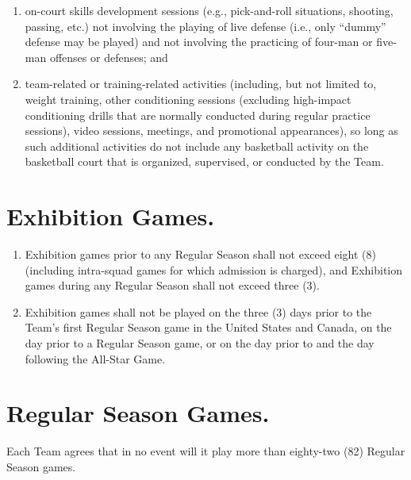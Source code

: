 \documentclass[
]{book}
\providecommand{\tightlist}{%
  \setlength{\itemsep}{0pt}\setlength{\parskip}{0pt}}
\begin{document}
\begin{enumerate}
\begin{enumerate}
    \begin{enumerate}
    \def\labelenumiii{(\Alph{enumiii})}
    \tightlist
    \item
      on-court skills development sessions (e.g., pick-and-roll situations, shooting, passing, etc.) not involving the playing of live defense (i.e., only ``dummy'' defense may be played) and not involving the practicing of four-man or five-man offenses or defenses; and
    \item
      team-related or training-related activities (including, but not limited to, weight training, other conditioning sessions (excluding high-impact conditioning drills that are normally conducted during regular practice sessions), video sessions, meetings, and promotional appearances), so long as such additional activities do not include any basketball activity on the basketball court that is organized, supervised, or conducted by the Team.
    \end{enumerate}
  \end{enumerate}
\end{enumerate}

\hypertarget{exhibition-games.}{%
\section{Exhibition Games.}\label{exhibition-games.}}

\begin{enumerate}
\def\labelenumi{(\alph{enumi})}
\tightlist
\item
  Exhibition games prior to any Regular Season shall not exceed eight (8) (including intra-squad games for which admission is charged), and Exhibition games during any Regular Season shall not exceed three (3).
\item
  Exhibition games shall not be played on the three (3) days prior to the Team's first Regular Season game in the United States and Canada, on the day prior to a Regular Season game, or on the day prior to and the day following the All-Star Game.
\end{enumerate}

\hypertarget{regular-season-games.}{%
\section{Regular Season Games.}\label{regular-season-games.}}

Each Team agrees that in no event will it play more than eighty-two (82) Regular Season games.
\end{document}

